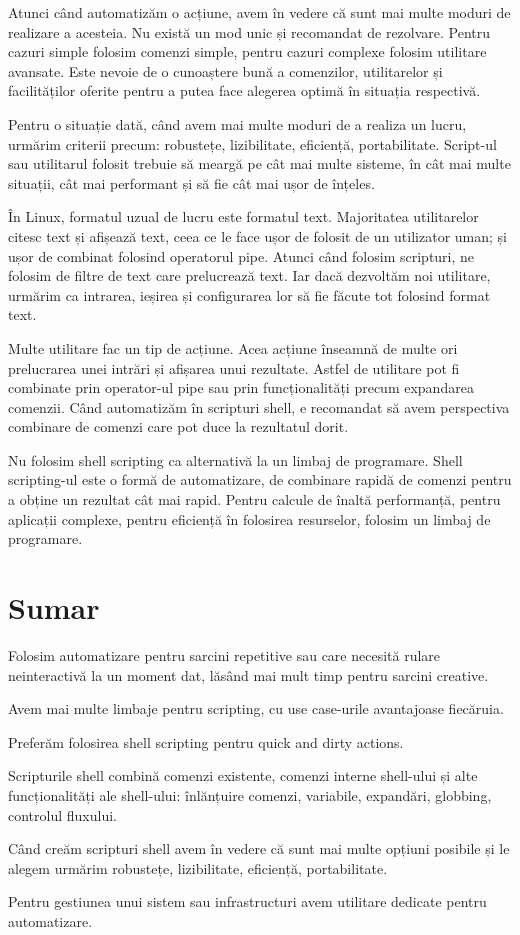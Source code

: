 Atunci când automatizăm o acțiune, avem în vedere că sunt mai multe moduri de
realizare a acesteia. Nu există un mod unic și recomandat de rezolvare. Pentru
cazuri simple folosim comenzi simple, pentru cazuri complexe folosim utilitare
avansate. Este nevoie de o cunoaștere bună a comenzilor, utilitarelor și
facilităților oferite pentru a putea face alegerea optimă în situația
respectivă.

Pentru o situație dată, când avem mai multe moduri de a realiza un lucru,
urmărim criterii precum: robustețe, lizibilitate, eficiență, portabilitate.
Script-ul sau utilitarul folosit trebuie să meargă pe cât mai multe sisteme, în
cât mai multe situații, cât mai performant și să fie cât mai ușor de înțeles.

În Linux, formatul uzual de lucru este formatul text. Majoritatea utilitarelor
citesc text și afișează text, ceea ce le face ușor de folosit de un utilizator
uman; și ușor de combinat folosind operatorul pipe. Atunci când folosim
scripturi, ne folosim de filtre de text care prelucrează text. Iar dacă
dezvoltăm noi utilitare, urmărim ca intrarea, ieșirea și configurarea lor să fie
făcute tot folosind format text.

Multe utilitare fac un tip de acțiune. Acea acțiune înseamnă de multe ori
prelucrarea unei intrări și afișarea unui rezultate. Astfel de utilitare pot fi
combinate prin operator-ul pipe sau prin funcționalități precum expandarea
comenzii. Când automatizăm în scripturi shell, e recomandat să avem perspectiva
combinare de comenzi care pot duce la rezultatul dorit.

Nu folosim shell scripting ca alternativă la un limbaj de programare. Shell
scripting-ul este o formă de automatizare, de combinare rapidă de comenzi pentru
a obține un rezultat cât mai rapid. Pentru calcule de înaltă performanță, pentru
aplicații complexe, pentru eficiență în folosirea resurselor, folosim un limbaj
de programare.

\section{Sumar}
\label{sec:script-sumar}

Folosim automatizare pentru sarcini repetitive sau care necesită rulare
neinteractivă la un moment dat, lăsând mai mult timp pentru sarcini creative.

Avem mai multe limbaje pentru scripting, cu use case-urile avantajoase
fiecăruia.

Preferăm folosirea shell scripting pentru quick and dirty actions.

Scripturile shell combină comenzi existente, comenzi interne shell-ului și alte
funcționalități ale shell-ului: înlănțuire comenzi, variabile, expandări,
globbing, controlul fluxului.

Când creăm scripturi shell avem în vedere că sunt mai multe opțiuni posibile și
le alegem urmărim robustețe, lizibilitate, eficiență, portabilitate.

Pentru gestiunea unui sistem sau infrastructuri avem utilitare dedicate pentru
automatizare.
